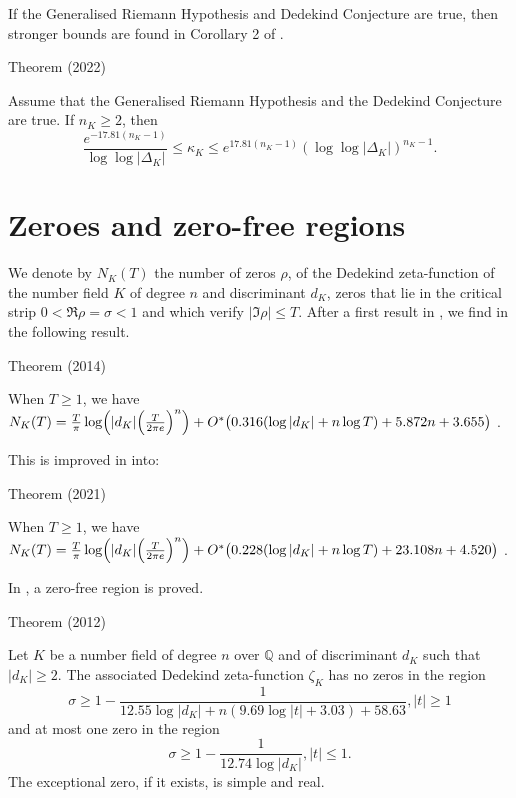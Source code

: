 If the Generalised Riemann Hypothesis and Dedekind Conjecture are
true, then stronger bounds are found in Corollary 2 of
\cite{Garcia-Lee*22b}.
\par 
\begin{thm}{Theorem (2022)}

    Assume that the Generalised Riemann Hypothesis and the Dedekind
    Conjecture are true. If $n_K\geq 2$, then 
$$
    \frac{e^{-17.81(n_K -1)}}{\log\log{|\Delta_K|}} \leq \kappa_{K}
    \leq e^{17.81(n_K -1 )} (\log\log{|\Delta_K|})^{n_K-1} . 
$$
\end{thm}

    


\section{Zeroes and zero-free regions }


We denote by $N_K(T)$ the number of zeros $\rho$, of the Dedekind
zeta-function of the number field $K$ of degree $n$ and discriminant
$d_K$,
zeros that lie in the critical strip
$0 < \Re \rho = \sigma < 1$ and which verify $|\Im \rho|\le T$.
After a first result in
\cite{Kadiri-Ng*12},
we find in
\cite{Trudgian*14-1}
the following result.

\par 
\begin{thm}{Theorem (2014)}

 When $T\ge1$, we have
 $N_K(T)=\frac{T}{\pi}\log\Bigl(|d_K|\Big(\frac{T}{2\pi e}\Bigr)^n\Bigr)
 +O^*\bigl(0.316(\log |d_K|+n\log T)+5.872 n+3.655\bigr)$ .
\end{thm}


This is improved in 
\cite{Hasanalizade-Shen-Wong*21}
into:

\par 
\begin{thm}{Theorem (2021)}

 When $T\ge1$, we have
 $N_K(T)=\frac{T}{\pi}\log\Bigl(|d_K|\Big(\frac{T}{2\pi e}\Bigr)^n\Bigr)
 +O^*\bigl(0.228(\log |d_K|+n\log T)+23.108 n+4.520\bigr)$ .
\end{thm}


In
\cite{Kadiri*12},
a zero-free region is proved.

\par 
\begin{thm}{Theorem (2012)}

Let $K$ be a number field of degree $n$ over $\mathbb{Q}$ and of
discriminant $d_K$ such that $|d_K| \ge 2$. The associated Dedekind
zeta-function $\zeta_K$ has no zeros in the region
$$
\sigma\ge 1-\frac{1}{12.55\log|d_K|+n(9.69\log|t|+3.03)+58.63}, |t|\ge1
$$
and at most one zero in the region
$$
\sigma\ge 1-\frac{1}{12.74\log|d_K|}, |t|\le 1.
$$
The exceptional zero, if it exists, is simple and real.
\end{thm}


